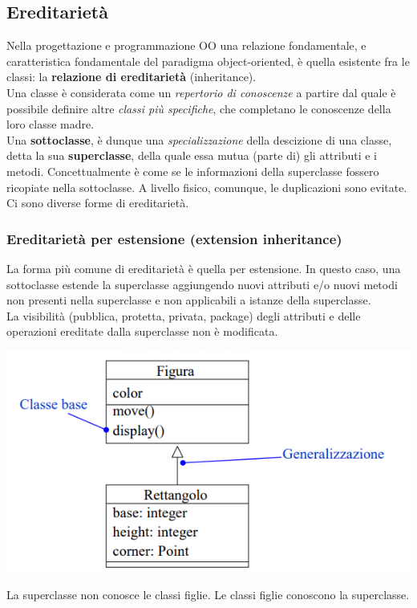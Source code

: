 \documentclass{article}
\begin{document}
	\subsection{Ereditarietà}
	Nella progettazione e programmazione OO una relazione fondamentale, e caratteristica fondamentale del paradigma object-oriented, è quella esistente fra le classi: la \textbf{relazione di ereditarietà} (inheritance).
	\vspace{\baselineskip} \\
	Una classe è considerata come un \textit{repertorio di conoscenze} a partire dal quale è possibile definire altre \textit{classi più specifiche}, che completano le conoscenze della loro classe madre.
	\vspace{\baselineskip} \\
	Una \textbf{sottoclasse}, è dunque una \textit{specializzazione} della descizione di una classe, detta la sua \textbf{superclasse}, della quale essa mutua (parte di) gli attributi e i metodi. Concettualmente è come se le informazioni della superclasse fossero ricopiate nella sottoclasse. A livello fisico, comunque, le duplicazioni sono evitate.
	\vspace{\baselineskip} \\
	Ci sono diverse forme di ereditarietà.

	\subsubsection{Ereditarietà per estensione (extension inheritance)}
	La forma più comune di ereditarietà è quella per estensione. In questo caso, una sottoclasse estende la superclasse aggiungendo nuovi attributi e/o nuovi metodi non presenti nella superclasse e non applicabili a istanze della superclasse.
	\vspace{\baselineskip} \\
	La visibilità (pubblica, protetta, privata, package) degli attributi e delle operazioni ereditate dalla superclasse non è modificata.
	\begin{center}
		\includegraphics[scale=0.7]{assets/ereditarieta_estensione.png}
	\end{center}
	La superclasse non conosce le classi figlie. Le classi figlie conoscono la superclasse.
\end{document}
